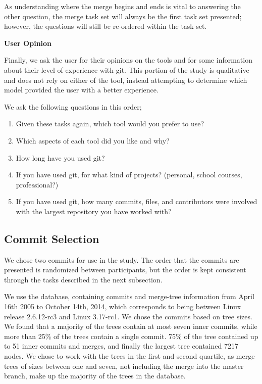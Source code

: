 As understanding where the merge begins and ends is vital to answering
the other question, the merge task set will always be the first task set
presented; however, the questions will still be re-ordered within the
task set.

\textbf{User Opinion}

Finally, we ask the user for their opinions on the tools and for some
information about their level of experience with git. This portion of
the study is qualitative and does not rely on either of the tool,
instead attempting to determine which model provided the user with a
better experience.

We ask the following questions in this order;

\begin{enumerate}
  \item Given these tasks again, which tool would you prefer to use?
  \item Which aspects of each tool did you like and why?
  \item How long have you used git?
  \item If you have used git, for what kind of projects? (personal,
    school courses, professional?)
  \item If you have used git, how many commits, files, and contributors
    were involved with the largest repository you have worked with?
\end{enumerate}


\subsection{Commit Selection}
\label{sub:commit_selection}

We chose two commits for use in the study. The order that the commits
are presented is randomized between participants, but the order is kept
consistent through the tasks described in the next subsection.

We use the \tool database, containing commits and merge-tree information
from April 16th 2005 to October 14th, 2014, which corresponds to being
between Linux release 2.6.12-rc3 and Linux 3.17-rc1.  We chose the commits based on tree sizes. We
found that a majority of the trees contain at most seven inner commits,
while more than 25\% of the trees contain a single commit. 75\% of the
tree contained up to 51 inner commits and merges, and finally the
largest tree contained 7217 nodes. We chose to work with the trees in
the first and second quartile, as merge trees of sizes between one and
seven, not including the merge into the master branch, make up the
majority of the trees in the database.

